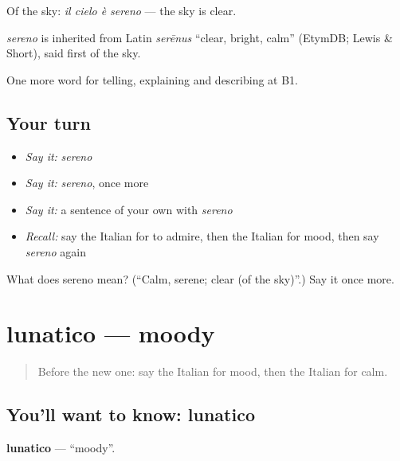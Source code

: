 Of the sky: \emph{il cielo è sereno} — the sky is clear.

\begin{cousinweb}
\emph{sereno} is inherited from Latin \emph{serēnus} \textquotedblleft{}clear, bright, calm\textquotedblright{} (EtymDB; Lewis \& Short), said first of the sky.
\end{cousinweb}

\begin{grammarlens}[title={What you've built}]
One more word for telling, explaining and describing at B1.
\end{grammarlens}

\subsection*{Your turn}
\begin{itemize}
\raggedright
  \item \emph{Say it:} \emph{sereno}
  \item \emph{Say it:} \emph{sereno}, once more
  \item \emph{Say it:} a sentence of your own with \emph{sereno}
  \item \emph{Recall:} say the Italian for to admire, then the Italian for mood, then say \emph{sereno} again
\end{itemize}

\begin{tcolorbox}[breakable,colback=teal!4,colframe=teal!35!black,title={Before you move on}]
What does sereno mean? (\textquotedblleft{}Calm, serene; clear (of the sky)\textquotedblright{}.) Say it once more.
\end{tcolorbox}
\section[lunatico]{lunatico — moody}

\label{lesson:IT-C474-lunatico}



\begin{quote}
Before the new one: say the Italian for mood, then the Italian for calm.
\end{quote}

\subsection*{You'll want to know: lunatico}
\textbf{lunatico} — \textquotedblleft{}moody\textquotedblright{}.

